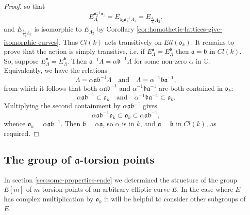 \begin{proof}
  so that
  \begin{equation*}
    E_{\Lambda_{1}}^{\mathfrak{a}_{2}^{-1}\mathfrak{a}_{1}} =
    E_{\mathfrak{a}_{2}\mathfrak{a}_{1}^{-1}\Lambda_{1}} = E_{\frac{\lambda_{1}}{\lambda_{2}}\Lambda_{2}},
  \end{equation*}
  and $E_{\frac{\lambda_{1}}{\lambda_{2}}\Lambda_{2}}$ is isomorphic to
  $E_{\Lambda_{2}}$ by Corollary
  \ref{cor:homothetic-lattices-give-isomorphic-curves}.  Thus $Cl(k)$ acts
  transitively on $Ell(\mathfrak{o}_{k})$.  It remains to prove that the action is
  simply transitive, i.e. if $E_{\Lambda}^{\mathfrak{a}} =
  E_{\Lambda}^{\mathfrak{b}}$ then $\mathfrak{a} = \mathfrak{b}$ in $Cl(k)$.  So,
  suppose $E_{\Lambda}^{\mathfrak{a}} = E_{\Lambda}^{\mathfrak{b}}$.  Then
  $\mathfrak{a}^{-1}\Lambda = \alpha \mathfrak{b}^{-1}\Lambda$ for some non-zero
  $\alpha$ in $\mathbb{C}$.  Equivalently, we have the relations
  \begin{equation*}
    \Lambda = \alpha\mathfrak{a}\mathfrak{b}^{-1}\Lambda \quad \text{and} \quad
    \Lambda = \alpha^{-1}\mathfrak{b}\mathfrak{a}^{-1},
  \end{equation*}
  from which it follows that both $\alpha\mathfrak{a}\mathfrak{b}^{-1}$ and
  $\alpha^{-1}\mathfrak{b}\mathfrak{a}^{-1}$ are both contained in
  $\mathfrak{o}_{k}$:
  \begin{equation*}
    \alpha\mathfrak{a}\mathfrak{b}^{-1} \subset \mathfrak{o}_{k} \quad
    \text{and} \quad \alpha^{-1}\mathfrak{b}\mathfrak{a}^{-1} \subset \mathfrak{o}_{k}.
  \end{equation*}
  Multiplying the second containment by $\alpha\mathfrak{a}\mathfrak{b}^{-1}$ gives
  \begin{equation*}
    \alpha\mathfrak{a}\mathfrak{b}^{-1} \mathfrak{o}_{k} \subset \mathfrak{o}_{k}
    \subset \alpha\mathfrak{a}\mathfrak{b}^{-1},
  \end{equation*}
  whence $\mathfrak{o}_{k} = \alpha\mathfrak{a}\mathfrak{b}^{-1}$.  Then
  $\mathfrak{b} = \alpha \mathfrak{a}$, so $\alpha$ is in $k$, and $\mathfrak{a} =
  \mathfrak{b}$ in $Cl(k)$, as required.
\end{proof}



\subsection{The group of $\mathfrak{a}$-torsion points}
\label{sec:group-a-tors}

In section \ref{sec:some-properties-ende} we determined the structure of the group
$E[m]$ of $m$-torsion points of an arbitrary elliptic curve $E$.  In the case where
$E$ has complex multiplication by $\mathfrak{o}_{k}$ it will be helpful to consider
other subgroups of $E$.

